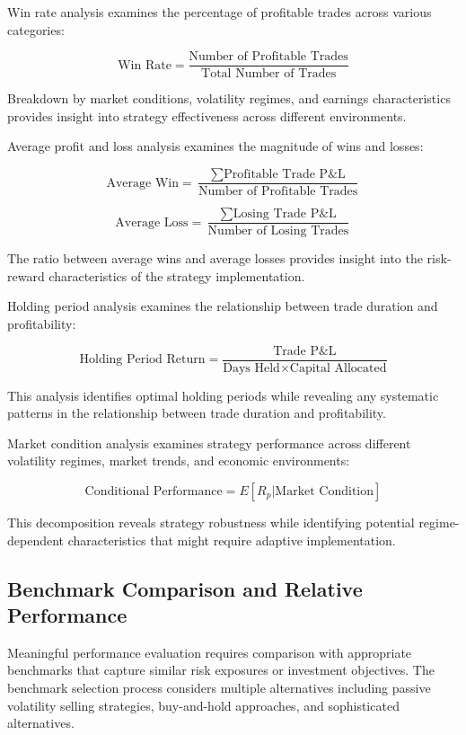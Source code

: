 \documentclass[
  american,
  11pt,
  11pt,
  letterpaper,
  onecolumn]{article}
\begin{document}
Win rate analysis examines the percentage of profitable trades across
various categories:

\[\text{Win Rate} = \frac{\text{Number of Profitable Trades}}{\text{Total Number of Trades}}\]

Breakdown by market conditions, volatility regimes, and earnings
characteristics provides insight into strategy effectiveness across
different environments.

Average profit and loss analysis examines the magnitude of wins and
losses:

\[\text{Average Win} = \frac{\sum \text{Profitable Trade P\&L}}{\text{Number of Profitable Trades}}\]

\[\text{Average Loss} = \frac{\sum \text{Losing Trade P\&L}}{\text{Number of Losing Trades}}\]

The ratio between average wins and average losses provides insight into
the risk-reward characteristics of the strategy implementation.

Holding period analysis examines the relationship between trade duration
and profitability:

\[\text{Holding Period Return} = \frac{\text{Trade P\&L}}{\text{Days Held} \times \text{Capital Allocated}}\]

This analysis identifies optimal holding periods while revealing any
systematic patterns in the relationship between trade duration and
profitability.

Market condition analysis examines strategy performance across different
volatility regimes, market trends, and economic environments:

\[\text{Conditional Performance} = E[R_p | \text{Market Condition}]\]

This decomposition reveals strategy robustness while identifying
potential regime-dependent characteristics that might require adaptive
implementation.

\subsection{Benchmark Comparison and Relative
Performance}\label{benchmark-comparison-and-relative-performance}

Meaningful performance evaluation requires comparison with appropriate
benchmarks that capture similar risk exposures or investment objectives.
The benchmark selection process considers multiple alternatives
including passive volatility selling strategies, buy-and-hold
approaches, and sophisticated alternatives.
\end{document}
